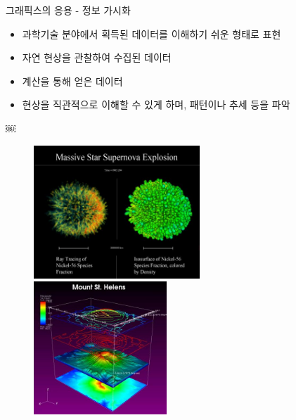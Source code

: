 \documentclass{beamer}
\begin{document}
\begin{frame}{그래픽스의 응용 - 정보 가시화}

\begin{itemize}
\item 과학기술 분야에서 획득된 데이터를 이해하기 쉬운 형태로 표현
\item 자연 현상을 관찰하여 수집된 데이터
\item 계산을 통해 얻은 데이터
\item 현상을 직관적으로 이해할 수 있게 하며, 패턴이나 추세 등을 파악
\end{itemize}
￼

\begin{figure}
    \includegraphics[height=5cm]{OGL_intro/visualization1.jpg}
    \includegraphics[height=5cm]{OGL_intro/visualization2.jpg}
\end{figure}

\end{frame}
\end{document}
